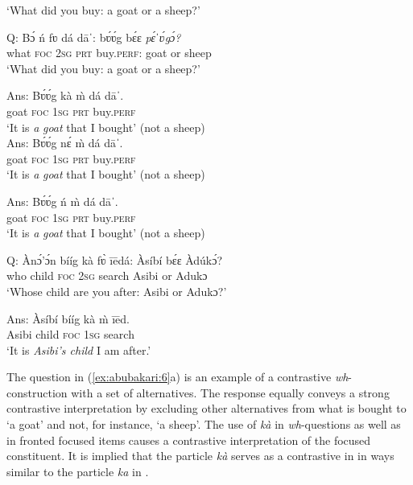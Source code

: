 \documentclass[output=paper,modfonts,nonflat,
\ChapterDOI{10.5281/zenodo.3367154}
 hidelinks
]{langsci/langscibook}
\begin{document}
\glt ‘What did you buy: a goat or a sheep?’ 

\ex \label{ex:abubakari:6c}
Q: \gll *Bɔ́  ń  fʋ  dá  dāˈ:    bʋ́ʋ́g  bɛ́ɛ \textit{pɛ́ˈʋ́gɔ́?}\\
what  \textsc{foc}  2\textsc{sg}  \textsc{prt}  buy.\textsc{perf}:  goat  or sheep \\
\glt ‘What did you buy: a goat or a sheep?’ 

\ex \label{ex:abubakari:6d}
Ans: \gll  Bʋ́ʋ́g  kà  m̀  dá  dāˈ.\\
goat  \textsc{foc}  1\textsc{sg}  \textsc{prt}  buy.\textsc{perf}\\
\glt ‘It is \textit{a} \textit{goat} that I bought’ (not a sheep)\\

\ex \label{ex:abubakari:6e}
Ans: \gll *Bʋ́ʋ́g  nɛ́  m̀  dá  dāˈ.\\
 goat  \textsc{foc}  1\textsc{sg}  \textsc{prt}  buy.\textsc{perf}\\
\glt ‘It is \textit{a} \textit{goat} that I bought’ (not a sheep)

\ex\label{ex:abubakari:6f}
Ans: \gll *Bʋ́ʋ́g  ń  m̀  dá  dāˈ. \\
goat  \textsc{foc}  1\textsc{sg}  \textsc{prt}  buy.\textsc{perf}\\
\glt ‘It is \textit{a} \textit{goat} that I bought’ (not a sheep)\\
\z
\z
 

\ea\label{ex:abubakari:7}
\ea\label{ex:abubakari:7a}
Q: \gll Ànɔ́'ɔ́n  bííg  kà  fʋ̀  ī\={e}dá:  Àsíbí  bɛ́ɛ  Àdúkɔ́?      \\
who  child  \textsc{foc}  2\textsc{sg}  search  Asibi  or  Adukɔ         \\
\glt ‘Whose child are you after: Asibi or Adukɔ?’                         

\ex\label{ex:abubakari:7b}
Ans: \gll Àsíbí  bííg  kà  \`{m}  ī\={e}d.\\
Asibi  child  \textsc{foc}  1\textsc{sg}  search\\
\glt ‘It is \textit{Asibi’s child} I am after.'
\z
\z 

The question in (\ref{ex:abubakari:6}a) is an example of a contrastive \textit{wh}{}- construction with a set of alternatives. The response equally conveys a strong contrastive  interpretation by excluding other alternatives from what is bought to ‘a goat’ and not, for instance, ‘a sheep’. The use of \textit{kà} in \textit{wh}{}-questions as well as in fronted focused items causes a contrastive  interpretation of the focused constituent. It is implied that the particle \textit{kà} serves as a contrastive  in  in ways similar to the particle \textit{ka} in  \citep{hudu2012}. 
\end{document}
